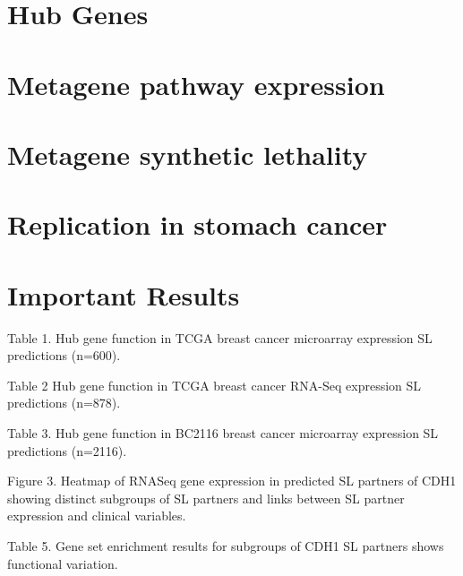 \section{Hub Genes}

\section{Metagene pathway expression}

\section{Metagene synthetic lethality}

\section{Replication in stomach cancer}

\section{Important Results}

Table 1.  Hub gene function in TCGA breast cancer microarray expression SL predictions (n=600).

Table 2 Hub gene function in TCGA breast cancer RNA-Seq expression SL predictions (n=878).

Table 3.  Hub gene function in BC2116 breast cancer microarray expression SL predictions (n=2116).

Figure 3.   Heatmap of RNASeq gene expression in predicted SL partners of CDH1 showing distinct subgroups of SL partners and links between SL partner expression and clinical variables.

Table 5.  Gene set enrichment results for subgroups of CDH1 SL partners shows functional variation.

